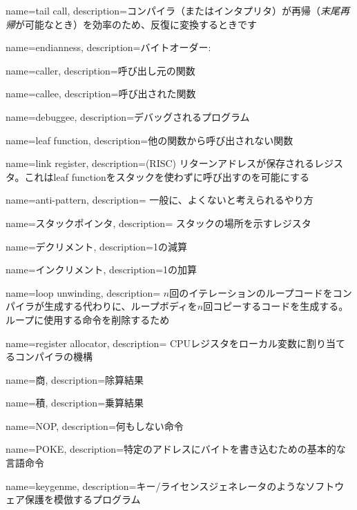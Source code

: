 {
  name=tail call,
  description={コンパイラ（またはインタプリタ）が再帰（\emph{末尾再帰}が可能なとき）を効率のため、反復に変換するときです}
}

{
  name=endianness,
  description={バイトオーダー: }
}

{
  name=caller,
  description={呼び出し元の関数}
}

{
  name=callee,
  description={呼び出された関数}
}

{
  name=debuggee,
  description={デバッグされるプログラム}
}

{
  name=leaf function,
  description={他の関数から呼び出されない関数}
}

{
  name=link register,
  description=(RISC) リターンアドレスが保存されるレジスタ。これはleaf functionをスタックを使わずに呼び出すのを可能にする
}

{
  name=anti-pattern,
  description=
  {一般に、よくないと考えられるやり方}
}

{
  name={スタックポインタ},
  description=
  {スタックの場所を示すレジスタ}
}

{
  name={デクリメント},
  description={1の減算}
}

{
  name={インクリメント},
  description={1の加算}
}

{
  name=loop unwinding,
  description={
  $n$回のイテレーションのループコードをコンパイラが生成する代わりに、ループボディを$n$回コピーするコードを生成する。
  ループに使用する命令を削除するため}
}

{
  name=register allocator,
  description=
  {CPUレジスタをローカル変数に割り当てるコンパイラの機構}
}

{
  name=商,
  description={除算結果}
}

{
  name=積,
  description={乗算結果}
}

{
  name=NOP,
  description={何もしない命令}
}

{
  name=POKE,
  description={特定のアドレスにバイトを書き込むための基本的な言語命令}
}

{
  name=keygenme,
  description={キー/ライセンスジェネレータのようなソフトウェア保護を模倣するプログラム}
} %

